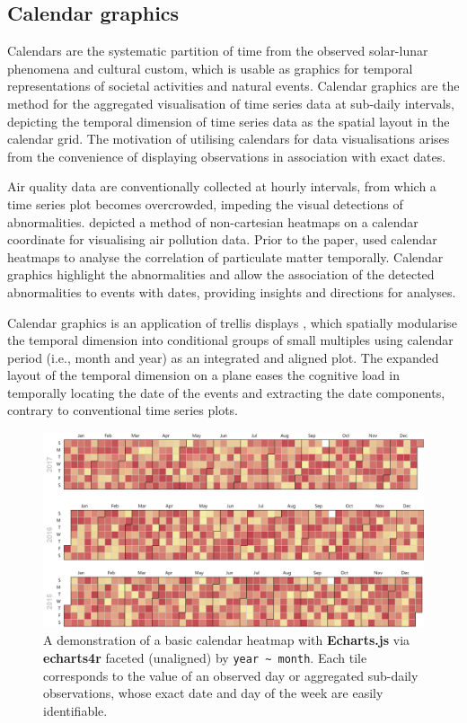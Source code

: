 \documentclass{aucklandthesis}
\begin{document}
\hypertarget{calendar-graphics}{%
\subsection{Calendar graphics}\label{calendar-graphics}}

Calendars are the systematic partition of time from the observed solar-lunar phenomena and cultural custom, which is usable as graphics for temporal representations of societal activities and natural events. Calendar graphics are the method for the aggregated visualisation of time series data at sub-daily intervals, depicting the temporal dimension of time series data as the spatial layout in the calendar grid. The motivation of utilising calendars for data visualisations arises from the convenience of displaying observations in association with exact dates.

Air quality data are conventionally collected at hourly intervals, from which a time series plot becomes overcrowded, impeding the visual detections of abnormalities. \textcite{calmap} depicted a method of non-cartesian heatmaps on a calendar coordinate for visualising air pollution data. Prior to the paper, \textcite{calmapi} used calendar heatmaps to analyse the correlation of particulate matter temporally. Calendar graphics highlight the abnormalities and allow the association of the detected abnormalities to events with dates, providing insights and directions for analyses.

Calendar graphics is an application of trellis displays \autocite{trellis}, which spatially modularise the temporal dimension into conditional groups of small multiples \autocite{tufte} using calendar period (i.e., month and year) as an integrated and aligned plot. The expanded layout of the temporal dimension on a plane eases the cognitive load \autocite{tufte} in temporally locating the date of the events and extracting the date components, contrary to conventional time series plots.

\begin{figure}
\includegraphics[width=1\linewidth]{figures/cal-demo} \caption{A demonstration of a basic calendar heatmap with \textbf{Echarts.js} \autocite{echarts} via \textbf{echarts4r} \autocite{echarts4r} faceted (unaligned) by \texttt{year\ \textasciitilde{}\ month}. Each tile corresponds to the value of an observed day or aggregated sub-daily observations, whose exact date and day of the week are easily identifiable.}\label{fig:cal-demo}
\end{figure}
\end{document}
